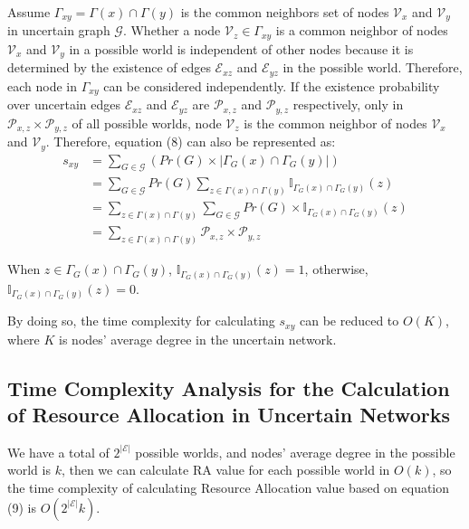 \documentclass[\main/thesis.tex]{subfiles}
\begin{document}
Assume $\Gamma_{xy} = \Gamma(x)\cap\Gamma(y)$ is the common neighbors set of nodes $\mathcal{V}_x$ and $\mathcal{V}_y$ in uncertain graph $\mathcal{G}$. Whether a node $\mathcal{V}_z \in \Gamma_{xy}$ is a common neighbor of nodes $\mathcal{V}_x$ and $\mathcal{V}_y$ in a possible world is independent of other nodes because it is determined by the existence of edges $\mathcal{E}_{xz}$ and $\mathcal{E}_{yz}$ in the possible world. Therefore, each node in $\Gamma_{xy}$ can be considered independently. If the existence probability over uncertain edges $\mathcal{E}_{xz}$ and $\mathcal{E}_{yz}$ are $\mathcal{P}_{x,z}$ and $\mathcal{P}_{y,z}$ respectively, only in $\mathcal{P}_{x,z}\times\mathcal{P}_{y,z}$ of all possible worlds, node $\mathcal{V}_z$ is the common neighbor of nodes $\mathcal{V}_x$ and $\mathcal{V}_y$. Therefore, equation (8) can also be represented as:
\begin{align*}
s_{xy}&=\sum_{G\in \mathcal{G}}( Pr(G)\times|\Gamma_G(x)\cap\Gamma_G(y)|)\\
&=\sum_{G\in \mathcal{G}}Pr(G)\sum_{z\in \Gamma(x)\cap\Gamma(y)}\mathbb{I}_{\Gamma_G(x)\cap\Gamma_G(y)}(z)\\
&=\sum_{z\in \Gamma(x)\cap\Gamma(y)}\sum_{G\in \mathcal{G}}Pr(G)\times\mathbb{I}_{\Gamma_G(x)\cap\Gamma_G(y)}(z)\\
&=\sum_{z\in \Gamma(x)\cap\Gamma(y)}\mathcal{P}_{x,z}\times\mathcal{P}_{y,z}
\end{align*}

When $z\in \Gamma_G(x)\cap\Gamma_G(y)$, $\mathbb{I}_{\Gamma_G(x)\cap\Gamma_G(y)}(z)=1$, otherwise, $\mathbb{I}_{\Gamma_G(x)\cap\Gamma_G(y)}(z)=0$.

By doing so, the time complexity for calculating $s_{xy}$ can be reduced to $O(K)$, where $K$ is nodes' average degree in the uncertain network.
\subsection{Time Complexity Analysis for the Calculation of Resource Allocation in Uncertain Networks}
We have a total of $2^{|\mathcal{E}|}$ possible worlds, and nodes' average degree in the possible world is $k$, then we can calculate RA value for each possible world in $O(k)$, so the time complexity of calculating Resource Allocation value based on equation (9) is $O(2^{|\mathcal{E}|}k)$.
\end{document}
